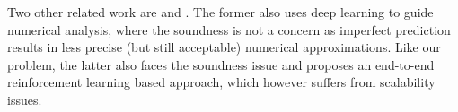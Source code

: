 Two other related work are \cite{He:pldi20} and \cite{Si:nips18}.
The former also uses deep learning to guide numerical analysis, where the soundness is not a concern as imperfect prediction results in less precise (but still acceptable) numerical approximations.
Like our problem, the latter also faces the soundness issue and proposes an end-to-end reinforcement learning based approach, which however suffers from scalability issues.
